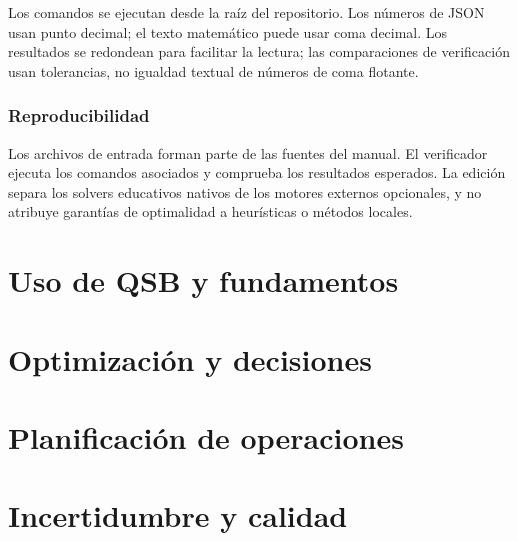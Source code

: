 \documentclass[11pt,openany]{book}
\theoremstyle{definition}
\begin{document}
Los comandos se ejecutan desde la raíz del repositorio. Los números de JSON usan
 punto decimal; el texto matemático puede usar coma decimal. Los resultados se
 redondean para facilitar la lectura; las comparaciones de verificación usan
 tolerancias, no igualdad textual de números de coma flotante.

\section*{Reproducibilidad}
Los archivos de entrada forman parte de las fuentes del manual. El verificador
 ejecuta los comandos asociados y comprueba los resultados esperados. La edición
 separa los solvers educativos nativos de los motores externos opcionales, y no
 atribuye garantías de optimalidad a heurísticas o métodos locales.

\tableofcontents
\listoftables

\mainmatter

\part{Uso de QSB y fundamentos}



\part{Optimización y decisiones}






\part{Planificación de operaciones}





\part{Incertidumbre y calidad}





\appendix


\backmatter


\end{document}
